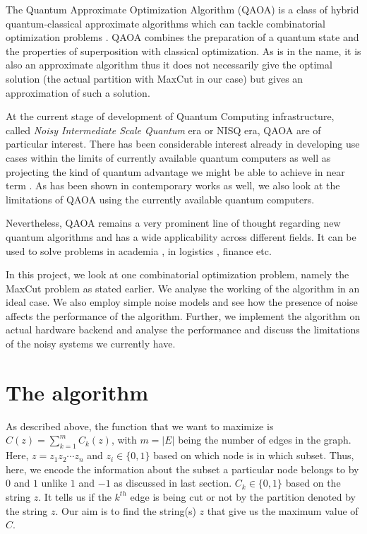 The Quantum Approximate Optimization Algorithm (QAOA) is a class of hybrid quantum-classical approximate algorithms which can tackle combinatorial optimization problems \cite{farhi2014quantum, alam2019analysis}.
QAOA combines the preparation of a quantum state and the properties of superposition with classical optimization.
As is in the name, it is also an approximate algorithm thus it does not necessarily give the optimal solution (the actual partition with MaxCut in our case) but gives an approximation of such a solution.

At the current stage of development of Quantum Computing infrastructure, called \textit{Noisy Intermediate Scale Quantum} era or NISQ era, QAOA are of particular interest.
There has been considerable interest already in developing use cases within the limits of currently available quantum computers as well as projecting the kind of quantum advantage we might be able to achieve in near term \cite{Guerreschi_2019}.
As has been shown in contemporary works \cite{8957201} as well, we also look at the limitations of QAOA using the currently available quantum computers.

Nevertheless, QAOA remains a very prominent line of thought regarding new quantum algorithms and has a wide applicability across different fields.
It can be used to solve problems in academia \cite{Bengtsson_2020}, in logistics \cite{Vikst_l_2020}, finance etc.

In this project, we look at one combinatorial optimization problem, namely the MaxCut problem as stated earlier.
We analyse the working of the algorithm in an ideal case.
We also employ simple noise models and see how the presence of noise affects the performance of the algorithm.
Further, we implement the algorithm on actual hardware backend and analyse the performance and discuss the limitations of the noisy systems we currently have.

\section{The algorithm}

As described above, the function that we want to maximize is $C(z)=\sum_{k=1}^m C_k(z)$, with $m=|E|$ being the number of edges in the graph.
Here, $z=z_1z_2\cdots z_n$ and $z_i\in \{0,1\}$ based on which node is in which subset.
Thus, here, we encode the information about the subset a particular node belongs to by $0$ and $1$ unlike $1$ and $-1$ as discussed in last section.
$C_k \in \{0, 1\}$ based on the string $z$. It tells us if the $k^{th}$ edge is being cut or not by the partition denoted by the string $z$.
Our aim is to find the string(s) $z$ that give us the maximum value of $C$.

